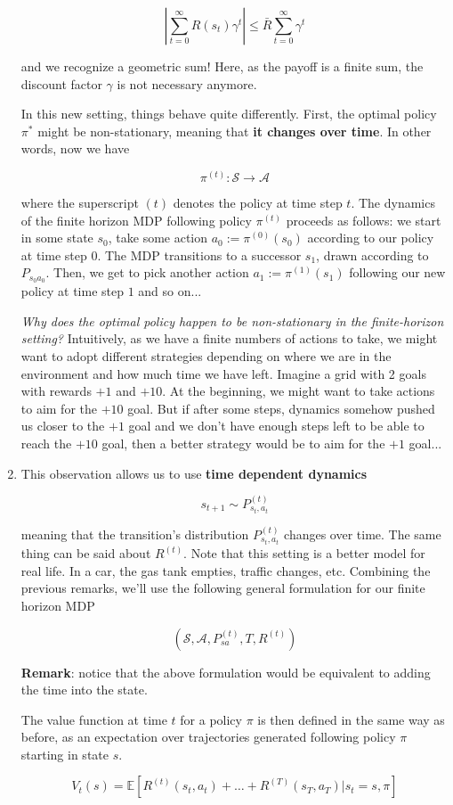 \documentclass{article}
\begin{document}
\begin{enumerate}
	\[ | \sum_{t=0}^{\infty} R(s_t) \gamma^t | \leq \bar{R} \sum_{t=0}^{\infty} \gamma^t \]
	
	and we recognize a geometric sum! Here, as the payoff is a finite sum, the discount factor $ \gamma $ is not necessary anymore.
	
	\vspace{1cm}
	
	In this new setting, things behave quite differently. First, the optimal policy $ \pi^* $ might be non-stationary, meaning that \textbf{it changes over time}. In other words, now we have 
	
	\[ \pi^{(t)} : \mathcal{S} \rightarrow \mathcal{A} \]
	
	where the superscript $ (t) $ denotes the policy at time step $ t $. The dynamics of the finite horizon MDP following policy $ \pi^{(t)} $ proceeds as follows: we start in some state $ s_0 $, take some action $ a_0 := \pi^{(0)} (s_0) $ according to our policy at time step $ 0 $. The MDP transitions to a successor $ s_1 $, drawn according to $ P_{s_0 a_0} $. Then, we get to pick another action $ a_1 := \pi^{(1)} (s_1) $ following our new policy at time step $ 1 $ and so on...
	
	
	\vspace{1cm}
	\textit{Why does the optimal policy happen to be non-stationary in the finite-horizon setting?} Intuitively, as we have a finite numbers of actions to take, we might want to adopt different strategies depending on where we are in the environment and how much time we have left. Imagine a grid with 2 goals with rewards $ +1 $ and $ +10 $. At the beginning, we might want to take actions to aim for the $ +10 $ goal. But if after some steps, dynamics somehow pushed us closer to the $ +1 $ goal and we don't have enough steps left to be able to reach the $ +10 $ goal, then a better strategy would be to aim for the $ +1 $ goal...
	
	\item This observation allows us to use \textbf{time dependent dynamics}
	
	\[ s_{t+1} \sim P_{s_t, a_t}^{(t)} \]
	
	meaning that the transition's distribution $ P_{s_t, a_t}^{(t)} $ changes over time. The same thing can be said about $ R^{(t)} $. Note that this setting is a better model for real life. In a car, the gas tank empties, traffic changes, etc. Combining the previous remarks, we'll use the following general formulation for our finite horizon MDP
	
 	\[ \left( \mathcal{S}, \mathcal{A},  P_{sa}^{(t)}, T,  R^{(t)} \right) \]
 	
 	\textbf{Remark}: notice that the above formulation would be equivalent to adding the time into the state.
 	
	The value function at time $ t $ for a policy $ \pi $ is then defined in the same way as before, as an expectation over trajectories generated following policy $ \pi $ starting in state $ s $.
	
	\[ V_t(s) = \mathbb{E} \left[R^{(t)} (s_t, a_t) + \dots + R^{(T)} (s_T, a_T) | s_t = s, \pi \right] \]
\end{enumerate}
\end{document}
